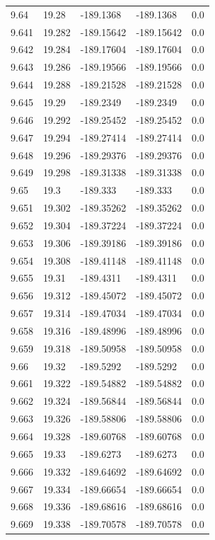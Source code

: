 \begin{tabular}{lllll}
9.64 & 19.28 & -189.1368 & -189.1368 & 0.0 \\
9.641 & 19.282 & -189.15642 & -189.15642 & 0.0 \\
9.642 & 19.284 & -189.17604 & -189.17604 & 0.0 \\
9.643 & 19.286 & -189.19566 & -189.19566 & 0.0 \\
9.644 & 19.288 & -189.21528 & -189.21528 & 0.0 \\
9.645 & 19.29 & -189.2349 & -189.2349 & 0.0 \\
9.646 & 19.292 & -189.25452 & -189.25452 & 0.0 \\
9.647 & 19.294 & -189.27414 & -189.27414 & 0.0 \\
9.648 & 19.296 & -189.29376 & -189.29376 & 0.0 \\
9.649 & 19.298 & -189.31338 & -189.31338 & 0.0 \\
9.65 & 19.3 & -189.333 & -189.333 & 0.0 \\
9.651 & 19.302 & -189.35262 & -189.35262 & 0.0 \\
9.652 & 19.304 & -189.37224 & -189.37224 & 0.0 \\
9.653 & 19.306 & -189.39186 & -189.39186 & 0.0 \\
9.654 & 19.308 & -189.41148 & -189.41148 & 0.0 \\
9.655 & 19.31 & -189.4311 & -189.4311 & 0.0 \\
9.656 & 19.312 & -189.45072 & -189.45072 & 0.0 \\
9.657 & 19.314 & -189.47034 & -189.47034 & 0.0 \\
9.658 & 19.316 & -189.48996 & -189.48996 & 0.0 \\
9.659 & 19.318 & -189.50958 & -189.50958 & 0.0 \\
9.66 & 19.32 & -189.5292 & -189.5292 & 0.0 \\
9.661 & 19.322 & -189.54882 & -189.54882 & 0.0 \\
9.662 & 19.324 & -189.56844 & -189.56844 & 0.0 \\
9.663 & 19.326 & -189.58806 & -189.58806 & 0.0 \\
9.664 & 19.328 & -189.60768 & -189.60768 & 0.0 \\
9.665 & 19.33 & -189.6273 & -189.6273 & 0.0 \\
9.666 & 19.332 & -189.64692 & -189.64692 & 0.0 \\
9.667 & 19.334 & -189.66654 & -189.66654 & 0.0 \\
9.668 & 19.336 & -189.68616 & -189.68616 & 0.0 \\
9.669 & 19.338 & -189.70578 & -189.70578 & 0.0 \\

\end{tabular}
